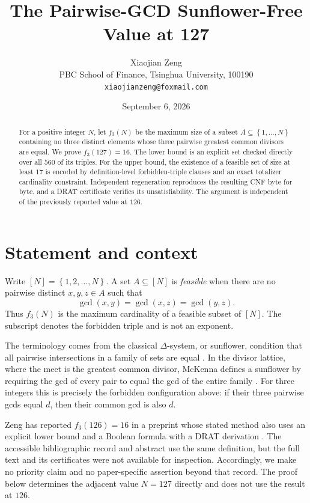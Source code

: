 \documentclass[11pt]{article}
\title{The Pairwise-GCD Sunflower-Free Value at 127}
\author{Xiaojian Zeng\\
PBC School of Finance, Tsinghua University, 100190\\
\texttt{xiaojianzeng@foxmail.com}}
\date{September 6, 2026}
\newcommand{\set}[1]{\left\{#1\right\}}
\begin{document}
\maketitle

\begin{abstract}
For a positive integer $N$, let $f_3(N)$ be the maximum size of a subset
$A\subseteq\set{1,\ldots,N}$ containing no three distinct elements whose
three pairwise greatest common divisors are equal.  We prove
$f_3(127)=16$.  The lower bound is an explicit set checked directly over
all $560$ of its triples.  For the upper bound, the existence of a feasible
set of size at least $17$ is encoded by definition-level forbidden-triple
clauses and an exact totalizer cardinality constraint.  Independent
regeneration reproduces the resulting CNF byte for byte, and a DRAT
certificate verifies its unsatisfiability.  The argument is independent of
the previously reported value at $126$.
\end{abstract}

\section{Statement and context}

Write $[N]=\set{1,2,\ldots,N}$.  A set $A\subseteq[N]$ is \emph{feasible}
when there are no pairwise distinct $x,y,z\in A$ such that
\[
 \gcd(x,y)=\gcd(x,z)=\gcd(y,z).
\]
Thus $f_3(N)$ is the maximum cardinality of a feasible subset of $[N]$.
The subscript denotes the forbidden triple and is not an exponent.

The terminology comes from the classical $\Delta$-system, or sunflower,
condition that all pairwise intersections in a family of sets are equal
\cite{ErdosRado1960}.  In the divisor lattice, where the meet is the greatest
common divisor, McKenna defines a sunflower by requiring the gcd of every pair
to equal the gcd of the entire family \cite[Section~2]{McKenna2005}.  For three
integers this is precisely the forbidden configuration above: if their three
pairwise gcds equal $d$, then their common gcd is also $d$.

Zeng has reported $f_3(126)=16$ in a preprint whose stated method also uses
an explicit lower bound and a Boolean formula with a DRAT derivation
\cite{Zeng2026SSRN7395458}.  The accessible bibliographic record and abstract
use the same definition, but the full text and its certificates were not
available for inspection.  Accordingly, we make no priority claim and no
paper-specific assertion beyond that record.  The proof below determines the
adjacent value $N=127$ directly and does not use the result at $126$.
\end{document}
